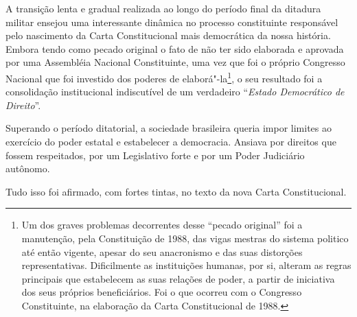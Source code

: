 A transição lenta e gradual realizada ao longo do período final da
ditadura militar ensejou uma interessante dinâmica no processo
constituinte responsável pelo nascimento da Carta Constitucional mais
democrática da nossa história. Embora tendo como pecado original o fato
de não ter sido elaborada e aprovada por uma Assembléia Nacional
Constituinte, uma vez que foi o próprio Congresso Nacional que foi
investido dos poderes de elaborá"-la\footnote{Um dos graves problemas
  decorrentes desse ``pecado original'' foi a manutenção, pela
  Constituição de 1988, das vigas mestras do sistema politico até então
  vigente, apesar do seu anacronismo e das suas distorções
  representativas. Dificilmente as instituições humanas, por si, alteram
  as regras principais que estabelecem as suas relações de poder, a
  partir de iniciativa dos seus próprios beneficiários. Foi o que
  ocorreu com o Congresso Constituinte, na elaboração da Carta
  Constitucional de 1988.}, o seu resultado foi a consolidação
institucional indiscutível de um verdadeiro ``\emph{Estado Democrático
de Direito}''.

Superando o período ditatorial, a sociedade brasileira queria impor
limites ao exercício do poder estatal e estabelecer a democracia.
Ansiava por direitos que fossem respeitados, por um Legislativo forte e
por um Poder Judiciário autônomo.

Tudo isso foi afirmado, com fortes tintas, no texto da nova Carta
Constitucional.

